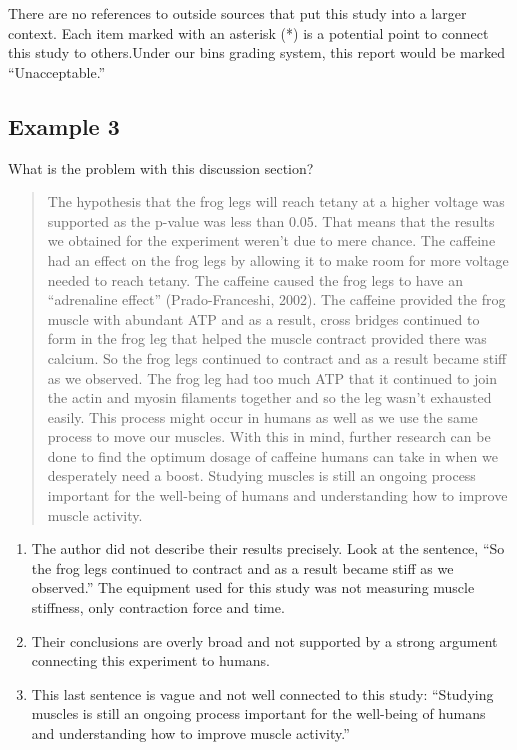 \documentclass[
]{book}
\providecommand{\tightlist}{%
  \setlength{\itemsep}{0pt}\setlength{\parskip}{0pt}}
\begin{document}
There are no references to outside sources that put this study into a larger context. Each item marked with an asterisk (*) is a potential point to connect this study to others.Under our bins grading system, this report would be marked ``Unacceptable.''

\hypertarget{example-3-6}{%
\subsection{Example 3}\label{example-3-6}}

What is the problem with this discussion section?

\begin{quote}
The hypothesis that the frog legs will reach tetany at a higher voltage was supported as the p-value was less than 0.05. That means that the results we obtained for the experiment weren't due to mere chance. The caffeine had an effect on the frog legs by allowing it to make room for more voltage needed to reach tetany. The caffeine caused the frog legs to have an ``adrenaline effect'' (Prado-Franceshi, 2002). The caffeine provided the frog muscle with abundant ATP and as a result, cross bridges continued to form in the frog leg that helped the muscle contract provided there was calcium. So the frog legs continued to contract and as a result became stiff as we observed. The frog leg had too much ATP that it continued to join the actin and myosin filaments together and so the leg wasn't exhausted easily. This process might occur in humans as well as we use the same process to move our muscles. With this in mind, further research can be done to find the optimum dosage of caffeine humans can take in when we desperately need a boost. Studying muscles is still an ongoing process important for the well-being of humans and understanding how to improve muscle activity.
\end{quote}

\begin{enumerate}
\def\labelenumi{\arabic{enumi}.}
\tightlist
\item
  The author did not describe their results precisely. Look at the sentence, ``So the frog legs continued to contract and as a result became stiff as we observed.'' The equipment used for this study was not measuring muscle stiffness, only contraction force and time.
\item
  Their conclusions are overly broad and not supported by a strong argument connecting this experiment to humans.
\item
  This last sentence is vague and not well connected to this study: ``Studying muscles is still an ongoing process important for the well-being of humans and understanding how to improve muscle activity.''
\end{enumerate}
\end{document}
